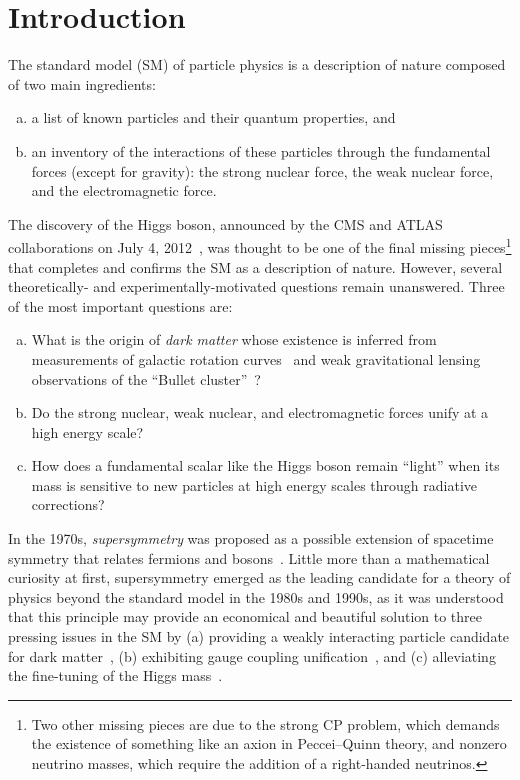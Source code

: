 \chapter{Introduction}
\label{ch:intro}

The standard model (SM) of particle physics is a description of nature
composed of two main ingredients:
\begin{enumerate}[(a)]
\item a list of known particles and their quantum properties, and
\item an inventory of the interactions of these particles through the fundamental forces
(except for gravity): the strong nuclear force, the weak nuclear force, and the electromagnetic
force. 
\end{enumerate}
The discovery of the Higgs boson, announced by the CMS and ATLAS
collaborations on July 4, 2012~\cite{CMShiggs,ATLAShiggs}, was
thought to be one of the final missing pieces\footnote{Two other missing
  pieces are due to the strong CP problem, which demands the existence of
  something like an axion in Peccei--Quinn theory, and nonzero neutrino masses, which require the addition of a right-handed neutrinos.} that completes and confirms the
SM as a description of nature. However, several theoretically- and
experimentally-motivated questions remain unanswered. Three
of the most important questions are:
\begin{enumerate}[(a)]
\item What is the origin of \emph{dark matter} whose existence is
  inferred from measurements of galactic rotation curves~\cite{1980ApJrotationcurves,1989HIrotationcurves} and weak gravitational lensing
  observations of the ``Bullet cluster''~\cite{Clowe:2006eq}?
\item Do the strong nuclear, weak nuclear, and electromagnetic
  forces unify at a high energy scale?
\item How does a fundamental scalar like the Higgs boson remain
  ``light'' when its mass is sensitive to new particles at high energy
  scales through radiative corrections?
\end{enumerate}

In the 1970s, \emph{supersymmetry} was proposed as a
possible extension of spacetime symmetry that relates fermions and
bosons~\cite{Ramond,Golfand,Volkov,Wess,Fayet}. Little
more than a mathematical curiosity at first, supersymmetry
emerged as the leading candidate for a theory of physics beyond the
standard model in the 1980s and 1990s, as it was understood that this 
principle may provide an economical and beautiful solution to
three pressing issues in the SM by (a) providing a weakly interacting particle candidate for dark
matter~\cite{Ellis:1983ew,Jungman:1995df}, (b) exhibiting gauge coupling
unification~\cite{Dimopoulos:1981yj,Marciano:1981un,Einhorn:1981sx,Ibanez:1981yh,Amaldi:1991cn,Langacker:1995fk},
and (c) alleviating the fine-tuning of the Higgs mass~\cite{Witten:1981nf,Dimopoulos:1981zb,Dine:1981za,Dimopoulos:1981au,Sakai:1981gr,Kaul:1981hi}.

